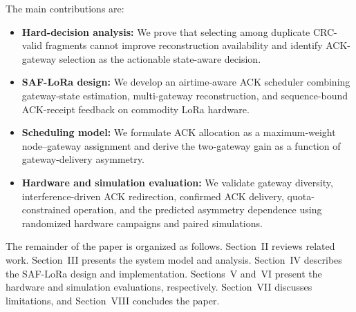 \documentclass[journal]{IEEEtran}
\begin{document}
The main contributions are:

\begin{itemize}
    \item \textbf{Hard-decision analysis:} We prove that selecting among duplicate CRC-valid fragments cannot improve reconstruction availability and identify ACK-gateway selection as the actionable state-aware decision.

    \item \textbf{SAF-LoRa design:} We develop an airtime-aware ACK scheduler combining gateway-state estimation, multi-gateway reconstruction, and sequence-bound ACK-receipt feedback on commodity LoRa hardware.

    \item \textbf{Scheduling model:} We formulate ACK allocation as a maximum-weight node--gateway assignment and derive the two-gateway gain as a function of gateway-delivery asymmetry.

    \item \textbf{Hardware and simulation evaluation:} We validate gateway diversity, interference-driven ACK redirection, confirmed ACK delivery, quota-constrained operation, and the predicted asymmetry dependence using randomized hardware campaigns and paired simulations.
\end{itemize}

The remainder of the paper is organized as follows. Section~II reviews related work. Section~III presents the system model and analysis. Section~IV describes the SAF-LoRa design and implementation. Sections~V and~VI present the hardware and simulation evaluations, respectively. Section~VII discusses limitations, and Section~VIII concludes the paper.
\end{document}
